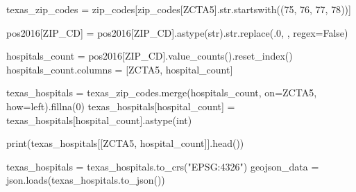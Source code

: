 \documentclass[
  letterpaper,
  DIV=11,
  numbers=noendperiod]{scrartcl}
\newenvironment{Shaded}{\begin{snugshade}}{\end{snugshade}}
\newcommand{\BuiltInTok}[1]{\textcolor[rgb]{0.00,0.23,0.31}{#1}}
\newcommand{\DecValTok}[1]{\textcolor[rgb]{0.68,0.00,0.00}{#1}}
\newcommand{\NormalTok}[1]{\textcolor[rgb]{0.00,0.23,0.31}{#1}}
\newcommand{\OperatorTok}[1]{\textcolor[rgb]{0.37,0.37,0.37}{#1}}
\newcommand{\StringTok}[1]{\textcolor[rgb]{0.13,0.47,0.30}{#1}}
\newcommand{\VariableTok}[1]{\textcolor[rgb]{0.07,0.07,0.07}{#1}}
\begin{document}
\begin{Shaded}
\begin{Highlighting}[]
\NormalTok{texas\_zip\_codes }\OperatorTok{=}\NormalTok{ zip\_codes[zip\_codes[}\StringTok{\textquotesingle{}ZCTA5\textquotesingle{}}\NormalTok{].}\BuiltInTok{str}\NormalTok{.startswith((}\StringTok{\textquotesingle{}75\textquotesingle{}}\NormalTok{, }\StringTok{\textquotesingle{}76\textquotesingle{}}\NormalTok{, }\StringTok{\textquotesingle{}77\textquotesingle{}}\NormalTok{, }\StringTok{\textquotesingle{}78\textquotesingle{}}\NormalTok{))]}

\NormalTok{pos2016[}\StringTok{\textquotesingle{}ZIP\_CD\textquotesingle{}}\NormalTok{] }\OperatorTok{=}\NormalTok{ pos2016[}\StringTok{\textquotesingle{}ZIP\_CD\textquotesingle{}}\NormalTok{].astype(}\BuiltInTok{str}\NormalTok{).}\BuiltInTok{str}\NormalTok{.replace(}\StringTok{\textquotesingle{}.0\textquotesingle{}}\NormalTok{, }\StringTok{\textquotesingle{}\textquotesingle{}}\NormalTok{, regex}\OperatorTok{=}\VariableTok{False}\NormalTok{)}

\NormalTok{hospitals\_count }\OperatorTok{=}\NormalTok{ pos2016[}\StringTok{\textquotesingle{}ZIP\_CD\textquotesingle{}}\NormalTok{].value\_counts().reset\_index()}
\NormalTok{hospitals\_count.columns }\OperatorTok{=}\NormalTok{ [}\StringTok{\textquotesingle{}ZCTA5\textquotesingle{}}\NormalTok{, }\StringTok{\textquotesingle{}hospital\_count\textquotesingle{}}\NormalTok{]}

\NormalTok{texas\_hospitals }\OperatorTok{=}\NormalTok{ texas\_zip\_codes.merge(hospitals\_count, on}\OperatorTok{=}\StringTok{\textquotesingle{}ZCTA5\textquotesingle{}}\NormalTok{, how}\OperatorTok{=}\StringTok{\textquotesingle{}left\textquotesingle{}}\NormalTok{).fillna(}\DecValTok{0}\NormalTok{)}
\NormalTok{texas\_hospitals[}\StringTok{\textquotesingle{}hospital\_count\textquotesingle{}}\NormalTok{] }\OperatorTok{=}\NormalTok{ texas\_hospitals[}\StringTok{\textquotesingle{}hospital\_count\textquotesingle{}}\NormalTok{].astype(}\BuiltInTok{int}\NormalTok{)}

\BuiltInTok{print}\NormalTok{(texas\_hospitals[[}\StringTok{\textquotesingle{}ZCTA5\textquotesingle{}}\NormalTok{, }\StringTok{\textquotesingle{}hospital\_count\textquotesingle{}}\NormalTok{]].head()) }

\NormalTok{texas\_hospitals }\OperatorTok{=}\NormalTok{ texas\_hospitals.to\_crs(}\StringTok{"EPSG:4326"}\NormalTok{)}
\NormalTok{geojson\_data }\OperatorTok{=}\NormalTok{ json.loads(texas\_hospitals.to\_json())}


\end{Highlighting}
\end{Shaded}
\end{document}
